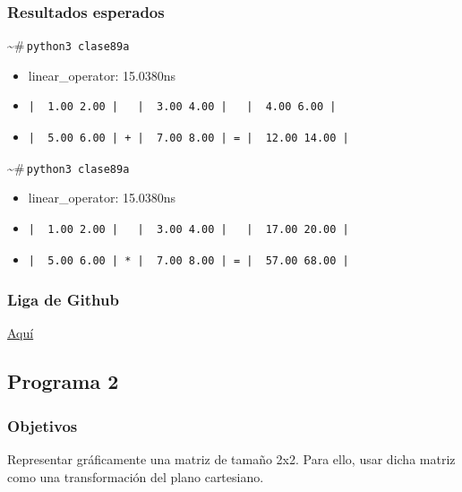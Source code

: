 \documentclass{article}[12pt,a4paper]
\newcommand{\bashps}{\textasciitilde\#\,}
\begin{document}
\subsubsection{Resultados esperados}

\bashps\texttt{python3 clase89a}

\begin{itemize}
  \item[] linear\_operator: 15.0380ns
  \item[] \begin{verbatim}
|  1.00 2.00 |   |  3.00 4.00 |   |  4.00 6.00 |\end{verbatim}
  \item[] \begin{verbatim}
|  5.00 6.00 | + |  7.00 8.00 | = |  12.00 14.00 |\end{verbatim}
\end{itemize}

\bashps\texttt{python3 clase89a}

\begin{itemize}
  \item[] linear\_operator: 15.0380ns
  \item[] \begin{verbatim}
|  1.00 2.00 |   |  3.00 4.00 |   |  17.00 20.00 |\end{verbatim}
  \item[] \begin{verbatim}
|  5.00 6.00 | * |  7.00 8.00 | = |  57.00 68.00 |\end{verbatim}
\end{itemize}

\subsubsection{Liga de \textbf{Github}}

\href{https://github.com/MarcosHCK/master-programming/tree/master/clase89a}{Aquí \faGithubSquare}

\subsection{Programa 2}

\subsubsection{Objetivos}

Representar gráficamente una matriz de tamaño 2x2. Para ello, usar dicha matriz como una transformación del plano cartesiano.
\end{document}
